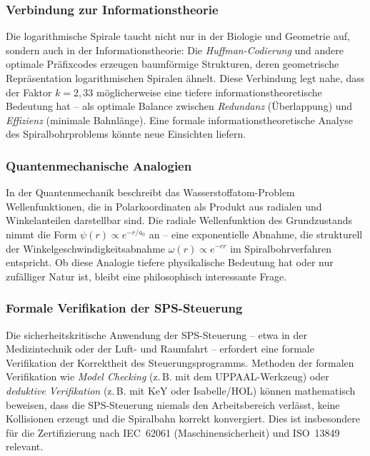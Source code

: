 ﻿\documentclass[12pt,a4paper]{article}
\begin{document}
\subsubsection{Verbindung zur Informationstheorie}

Die logarithmische Spirale taucht nicht nur in der Biologie und Geometrie auf, sondern auch in der Informationstheorie: Die \textit{Huffman-Codierung} und andere optimale Präfixcodes erzeugen baumförmige Strukturen, deren geometrische Repräsentation logarithmischen Spiralen ähnelt. Diese Verbindung legt nahe, dass der Faktor $k = 2{,}33$ möglicherweise eine tiefere informationstheoretische Bedeutung hat -- als optimale Balance zwischen \textit{Redundanz} (Überlappung) und \textit{Effizienz} (minimale Bahnlänge). Eine formale informationstheoretische Analyse des Spiralbohrproblems könnte neue Einsichten liefern.

\subsubsection{Quantenmechanische Analogien}

In der Quantenmechanik beschreibt das Wasserstoffatom-Problem Wellenfunktionen, die in Polarkoordinaten als Produkt aus radialen und Winkelanteilen darstellbar sind. Die radiale Wellenfunktion des Grundzustands nimmt die Form $\psi(r) \propto e^{-r/a_0}$ an -- eine exponentielle Abnahme, die strukturell der Winkelgeschwindigkeitsabnahme $\omega(r) \propto e^{-cr}$ im Spiralbohrverfahren entspricht. Ob diese Analogie tiefere physikalische Bedeutung hat oder nur zufälliger Natur ist, bleibt eine philosophisch interessante Frage.

\subsubsection{Formale Verifikation der SPS-Steuerung}

Die sicherheitskritische Anwendung der SPS-Steuerung -- etwa in der Medizintechnik oder der Luft- und Raumfahrt -- erfordert eine formale Verifikation der Korrektheit des Steuerungsprogramms. Methoden der formalen Verifikation wie \textit{Model Checking} (z.\,B. mit dem UPPAAL-Werkzeug) oder \textit{deduktive Verifikation} (z.\,B. mit KeY oder Isabelle/HOL) können mathematisch beweisen, dass die SPS-Steuerung niemals den Arbeitsbereich verlässt, keine Kollisionen erzeugt und die Spiralbahn korrekt konvergiert. Dies ist insbesondere für die Zertifizierung nach IEC~62061 (Maschinensicherheit) und ISO~13849 relevant.
\end{document}
